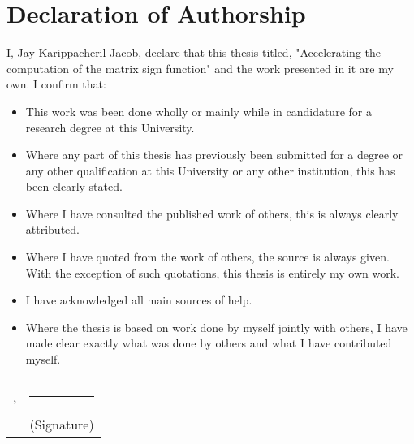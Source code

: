 \section*{Declaration of Authorship}


\vspace{20pt}

I, Jay Karippacheril Jacob, declare that this thesis titled, "Accelerating the computation of the matrix sign function" and the work presented in it are my own. I confirm that:

\vspace{10pt}

\begin{itemize}
	
	\item This work was been done wholly or mainly while in candidature for a research degree at this University.
	\item Where any part of this thesis has previously been submitted for a degree or any other qualification at this University or any other institution, this has been clearly stated.
	\item Where I have consulted the published work of others, this is always clearly attributed.
	\item Where I have quoted from the work of others, the source is always given. With the exception of such quotations, this thesis is entirely my own	work.
	\item  I have acknowledged all main sources of help.
	\item Where the thesis is based on work done by myself jointly with others, I have made clear exactly what was done by others and what I have contributed myself.
	
\end{itemize}

\vspace{40pt}

%
\begin{tabular}{lc}%
	\ort, \abgabedatum \hspace*{1cm}& \rule[2px]{5cm}{0.5px}\\%
	&\footnotesize{(Signature)}%
\end{tabular}
%
	